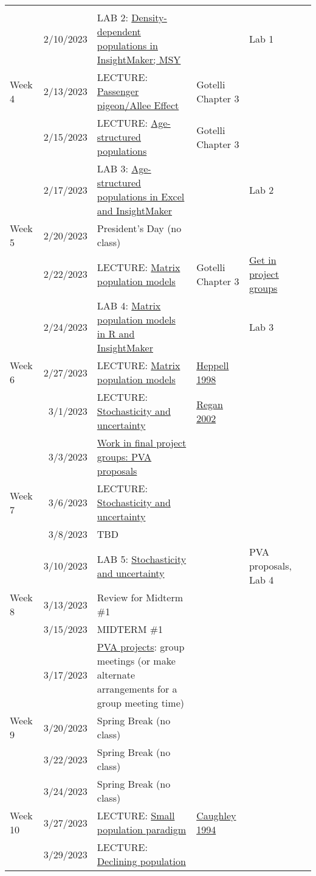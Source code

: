 \documentclass[
]{article}
\begin{document}
\begin{longtable}[]
{growth} & & \\
& 2/10/2023 & LAB 2: \href{LAB2.html}{Density-dependent populations in
InsightMaker; MSY} & & Lab 1 \\
Week 4 & 2/13/2023 & LECTURE: \href{LECTURE5.html}{Passenger
pigeon/Allee Effect} & Gotelli Chapter 3 & \\
& 2/15/2023 & LECTURE: \href{LECTURE6.html}{Age-structured populations}
& Gotelli Chapter 3 & \\
& 2/17/2023 & LAB 3: \href{LAB3.html}{Age-structured populations in
Excel and InsightMaker} & & Lab 2 \\
Week 5 & 2/20/2023 & President's Day (no class) & & \\
& 2/22/2023 & LECTURE: \href{LECTURE7.html}{Matrix population models} &
Gotelli Chapter 3 & \href{FINAL_PROJECTS.html}{Get in project groups} \\
& 2/24/2023 & LAB 4: \href{LAB4.html}{Matrix population models in R and
InsightMaker} & & Lab 3 \\
Week 6 & 2/27/2023 & LECTURE: \href{LECTURE7.html}{Matrix population
models} & \href{heppell1.pdf}{Heppell 1998} & \\
& 3/1/2023 & LECTURE: \href{LECTURE8.html}{Stochasticity and
uncertainty} & \href{Regan_2002.pdf}{Regan 2002} & \\
& 3/3/2023 & \href{FINAL_PROJECTS.html}{Work in final project groups:
PVA proposals} & & \\
Week 7 & 3/6/2023 & LECTURE: \href{LECTURE8.html}{Stochasticity and
uncertainty} & & \\
& 3/8/2023 & TBD & & \\
& 3/10/2023 & LAB 5: \href{LAB5.html}{Stochasticity and uncertainty} & &
PVA proposals, Lab 4 \\
Week 8 & 3/13/2023 & Review for Midterm \#1 & & \\
& 3/15/2023 & MIDTERM \#1 & & \\
& 3/17/2023 & \href{FINAL_PROJECTS.html}{PVA projects}: group meetings
(or make alternate arrangements for a group meeting time) & & \\
Week 9 & 3/20/2023 & Spring Break (no class) & & \\
& 3/22/2023 & Spring Break (no class) & & \\
& 3/24/2023 & Spring Break (no class) & & \\
Week 10 & 3/27/2023 & LECTURE: \href{LECTURE9.html}{Small population
paradigm} & \href{caughley1.pdf}{Caughley 1994} & \\
& 3/29/2023 & LECTURE: \href{LECTURE11.html}{Declining population
}
\end{longtable}
\end{document}
